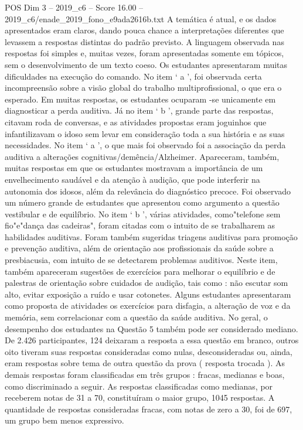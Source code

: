 \begin{textsample}{POS Dim 3 – 2019\_c6 – Score 16.00 – 2019\_c6/enade\_2019\_fono\_e9ada2616b.txt}
A temática é atual, e os dados apresentados eram claros, dando pouca chance a interpretações diferentes que levassem a respostas distintas do padrão previsto.
A linguagem observada nas respostas foi simples e, muitas vezes, foram apresentadas somente em tópicos, sem o desenvolvimento de um texto coeso.
Os estudantes apresentaram muitas dificuldades na execução do comando.
No item ‘ a ’, foi observada certa incompreensão sobre a visão global do trabalho multiprofissional, o que era o esperado.
Em muitas respostas, os estudantes ocuparam -se unicamente em diagnosticar a perda auditiva.
Já no item ‘ b ’, grande parte das respostas, citavam roda de conversas, e as atividades propostas eram joguinhos que infantilizavam o idoso sem levar em consideração toda a sua história e as suas necessidades.
No item ‘ a ’, o que mais foi observado foi a associação da perda auditiva a alterações cognitivas/demência/Alzheimer.
Apareceram, também, muitas respostas em que os estudantes mostravam a importância de um envelhecimento saudável e da atenção à audição, que pode interferir na autonomia dos idosos, além da relevância do diagnóstico precoce.
Foi observado um número grande de estudantes que apresentou como argumento a questão vestibular e de equilíbrio.
No item ‘ b ’, várias atividades, como"telefone sem fio"e"dança das cadeiras", foram citadas com o intuito de se trabalharem as habilidades auditivas.
Foram também sugeridas triagens auditivas para promoção e prevenção auditiva, além de orientação aos profissionais da saúde sobre a presbiacusia, com intuito de se detectarem problemas auditivos.
Neste item, também apareceram sugestões de exercícios para melhorar o equilíbrio e de palestras de orientação sobre cuidados de audição, tais como : não escutar som alto, evitar exposição a ruído e usar cotonetes.
Alguns estudantes apresentaram como proposta de atividades os exercícios para disfagia, a alteração de voz e da memória, sem correlacionar com a questão da saúde auditiva.
No geral, o desempenho dos estudantes na Questão 5 também pode ser considerado mediano.
De 2.426 participantes, 124 deixaram a resposta a essa questão em branco, outros oito tiveram suas respostas consideradas como nulas, desconsideradas ou, ainda, eram respostas sobre tema de outra questão da prova ( resposta trocada ).
As demais respostas foram classificadas em três grupos : fracas, medianas e boas, como discriminado a seguir.
As respostas classificadas como medianas, por receberem notas de 31 a 70, constituíram o maior grupo, 1045 respostas.
A quantidade de respostas consideradas fracas, com notas de zero a 30, foi de 697, um grupo bem menos expressivo.

\end{textsample}
